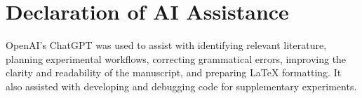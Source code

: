 \section{Declaration of AI Assistance}\label{sec:ai-assistance}

OpenAI's ChatGPT was used to assist with identifying relevant literature, planning experimental workflows, correcting grammatical errors, improving the clarity and readability of the manuscript, and preparing LaTeX formatting. It also assisted with developing and debugging code for supplementary experiments.